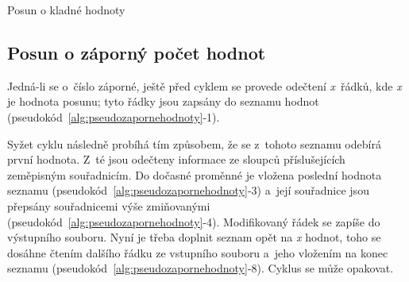 \begin{algorithm}
    \caption{Posun o kladné hodnoty}
    \label{alg:pseudokladnehodnoty}
    \begin{algorithmic}[1]

    \ENDWHILE
    \end{algorithmic}
\end{algorithm}

\subsection{Posun o záporný počet hodnot}
\label{zapornehodnoty}

Jedná-li se o~číslo záporné, ještě před cyklem se provede odečtení \textit{x}~řádků,
kde \textit{x} je hodnota posunu; tyto řádky jsou zapsány do seznamu hodnot
(pseudokód~\ref{alg:pseudozapornehodnoty}-1).

Syžet cyklu následně probíhá
tím způsobem, že se z~tohoto seznamu odebírá první hodnota. Z~té jsou odečteny informace ze
sloupců příslušejících zeměpisným souřadnicím. Do dočasné proměnné je vložena poslední
hodnota seznamu (pseudokód~\ref{alg:pseudozapornehodnoty}-3)
a~její souřadnice jsou pře\-psány souřadnicemi výše zmiňovanými
(pseudokód~\ref{alg:pseudozapornehodnoty}-4). Modifikovaný řádek
se zapíše do výstupního souboru. Nyní je třeba doplnit seznam opět na \textit{x} hodnot, toho
se dosáhne čtením dalšího řádku ze vstupního souboru a~jeho vložením na konec seznamu
(pseudokód~\ref{alg:pseudozapornehodnoty}-8). Cyklus
se může opakovat. 

